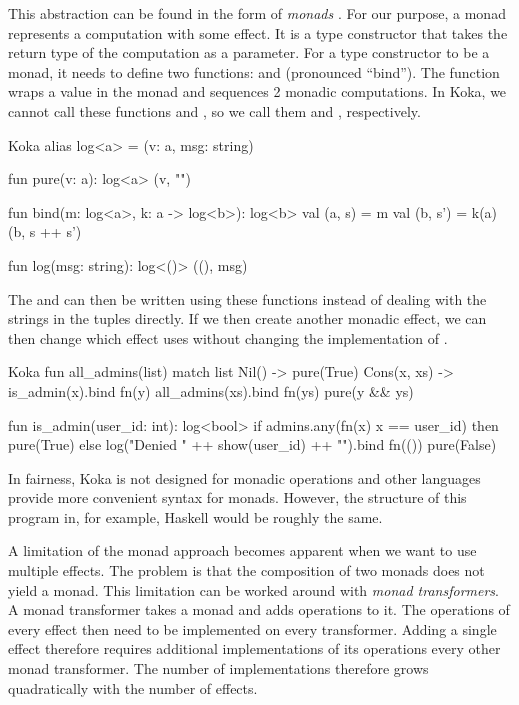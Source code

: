 This abstraction can be found in the form of \emph{monads} \autocite{wadler_essence_1992,peyton_jones_imperative_1993}. For our purpose, a monad represents a computation with some effect. It is a type constructor that takes the return type of the computation as a parameter. For a type constructor to be a monad, it needs to define two functions:  and \hs{>>=} (pronounced ``bind''). The  function wraps a value in the monad and \hs{>>=} sequences 2 monadic computations. In Koka, we cannot call these functions  and \hs{>>=}, so we call them  and , respectively.

\begin{lst}{Koka}
alias log<a> = (v: a, msg: string)

fun pure(v: a): log<a>
  (v, "")

fun bind(m: log<a>, k: a -> log<b>): log<b>
  val (a, s) = m
  val (b, s') = k(a)
  (b, s ++ s')

fun log(msg: string): log<()>
  ((), msg)
\end{lst}
%
The  and  can then be written using these functions instead of dealing with the strings in the tuples directly. If we then create another monadic effect, we can then change which effect  uses without changing the implementation of .

\begin{lst}{Koka}
fun all_admins(list)
  match list
    Nil() -> pure(True)
    Cons(x, xs) -> is_admin(x).bind fn(y)
      all_admins(xs).bind fn(ys)
        pure(y && ys)
  
fun is_admin(user_id: int): log<bool>
  if admins.any(fn(x) x == user_id)
  then pure(True)
  else
    log("Denied " ++ show(user_id) ++ "\n").bind fn(())
      pure(False)
\end{lst}
%
In fairness, Koka is not designed for monadic operations and other languages provide more convenient syntax for monads. However, the structure of this program in, for example, Haskell would be roughly the same.

A limitation of the monad approach becomes apparent when we want to use multiple effects. The problem is that the composition of two monads does not yield a monad. This limitation can be worked around with \emph{monad transformers}. A monad transformer takes a monad and adds operations to it. The operations of every effect then need to be implemented on every transformer. Adding a single effect therefore requires additional implementations of its operations every other monad transformer. The number of implementations therefore grows quadratically with the number of effects.

